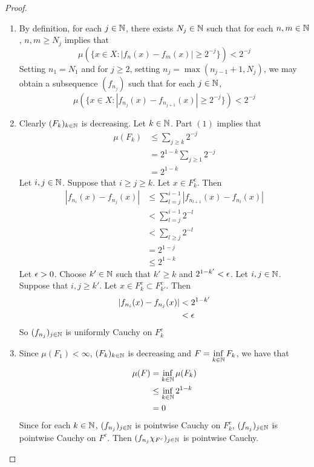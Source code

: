 \documentclass{book}
\begin{document}
	\begin{proof}\
	\begin{enumerate}
	\item By definition, for each $j \in \mathbb{N}$, there exists $N_j \in \mathbb{N}$ such that for each $n,m \in \mathbb{N}$, $n,m \geq N_j$ implies that 
	$$\mu(\{x \in X: |f_n(x) - f_m(x)| \geq 2^{-j} \}) < 2^{-j}$$ 
	Setting $n_1 = N_1$ and for $j \geq 2$, setting $n_j = \max (n_{j-1}+1, N_j)$, we may obtain a subsequence $(f_{n_j})$ such that for each $j \in \mathbb{N}$, 
	$$\mu(\{x \in X: |f_{n_j}(x) - f_{n_{j+1}}(x)| \geq 2^{-j}\}) < 2^{-j}$$
	\item Clearly $(F_k)_{k \in \mathbb{N}}$ is decreasing. Let $k \in \mathbb{N}$. Part $(1)$ implies that 
	\begin{align*}
	\mu(F_k) 
	&\leq \sum\limits_{j \geq k}2^{-j} \\
	&= 2^{1-k}\sum\limits_{j \geq 1}2^{-j}  \\
	&= 2^{1-k}
	\end{align*}
	Let $i, j \in \mathbb{N}$. Suppose that $i \geq j \geq k$. Let $x \in F_k^c$. Then 
	\begin{align*}
	|f_{n_i}(x) - f_{n_j}(x)| 
	& \leq \sum\limits_{l = j}^{i-1} |f_{n_{l+1}}(x) - f_{n_l}(x)| \\
	& < \sum\limits_{l = j}^{i-1} 2^{-l} \\
	& <  \sum\limits_{l \geq j} 2^{-l} \\
	&= 2^{1 - j} \\
	& \leq 2^{1 - k}	 
	\end{align*}
	Let $\epsilon >0$. Choose $k' \in \mathbb{N}$ such that $k' \geq k$ and $2^{1-k'} < \epsilon$. Let $i,j \in \mathbb{N}$. Suppose that $i,j \geq k'$. Let $x \in F_k^c \subset F_{k'}^c$. Then 
	\begin{align*}
	|f_{n_i}(x) - f_{n_j}(x)| 
	&< 2^{1-k'} \\
	&< \epsilon 
	\end{align*}
	So $(f_{n_j})_{j \in \mathbb{N}}$ is uniformly Cauchy on $F_k^c$
	\item Since $\mu(F_1) < \infty $, $(F_k)_{k \in \mathbb{N}}$ is decreasing and $F = \inf\limits_{k \in \mathbb{N}}F_k$, we have that
	\begin{align*}
	\mu(F) 
	&= \inf_{k \in \mathbb{N}} \mu(F_k) \\
	&\leq \inf_{k \in \mathbb{N}} 2^{1-k} \\
	&= 0
	\end{align*}
	Since for each $k \in \mathbb{N}$, $(f_{n_j})_{j \in \mathbb{N}}$ is pointwise Cauchy on $F^c_k$, $(f_{n_j})_{j \in \mathbb{N}}$ is pointwise Cauchy on $F^c$. Then $(f_{n_j}\chi_{F^c})_{j \in \mathbb{N}}$ is pointwise Cauchy. \\

\end{enumerate}
\end{proof}
\end{document}
